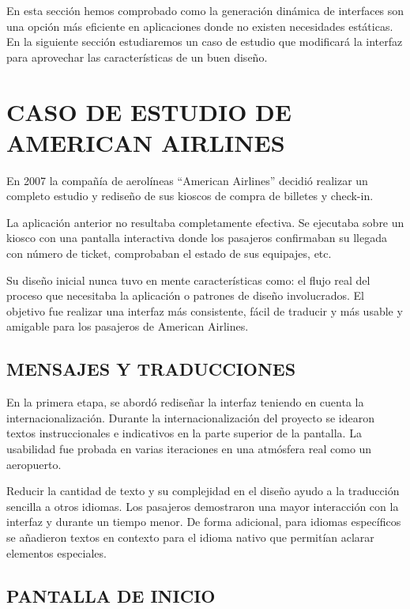 En esta sección hemos comprobado como la generación dinámica de interfaces
son una opción más eficiente en aplicaciones donde no existen necesidades
estáticas. En la siguiente sección estudiaremos un caso de estudio que
modificará la interfaz para aprovechar las características de un buen
diseño.

\section{\uppercase{Caso de Estudio de American Airlines}}

En 2007 la compañía de aerolíneas ``American Airlines'' decidió realizar un
completo estudio\cite{Hud10} y rediseño de sus kioscos de compra de billetes y
check-in.

La aplicación anterior no resultaba completamente efectiva. Se ejecutaba sobre
un kiosco con una pantalla interactiva donde los pasajeros confirmaban su
llegada con número de ticket, comprobaban el estado de sus equipajes, etc.

\newpage

Su diseño inicial nunca tuvo en mente características como: el flujo real del
proceso que necesitaba la aplicación o patrones de diseño involucrados. El 
objetivo fue realizar una interfaz más consistente, fácil de traducir y 
más usable y amigable para los pasajeros de American Airlines.

\subsection{\uppercase{Mensajes y traducciones}}

En la primera etapa, se abordó rediseñar la interfaz teniendo en cuenta
la internacionalización. Durante la internacionalización del proyecto se idearon textos
instruccionales e indicativos en la parte superior de la pantalla. La usabilidad
fue probada en varias iteraciones en una atmósfera real como un aeropuerto.

Reducir la cantidad de texto y su complejidad en el diseño ayudo a la traducción
sencilla a otros idiomas. Los pasajeros demostraron una mayor interacción con la
interfaz y durante un tiempo menor. De forma adicional, para idiomas específicos
se añadieron textos en contexto para el idioma nativo que permitían aclarar
elementos especiales.

\subsection{\uppercase{Pantalla de inicio}}

